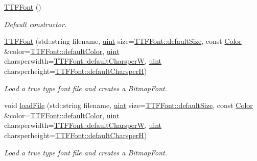 \begin{DoxyCompactItemize}
\item 
\hypertarget{class_f2_c_1_1_t_t_f_font_a20b84ac1e80b09afe11ee08945f8988a}{
\hyperlink{class_f2_c_1_1_t_t_f_font_a20b84ac1e80b09afe11ee08945f8988a}{TTFFont} ()}
\label{class_f2_c_1_1_t_t_f_font_a20b84ac1e80b09afe11ee08945f8988a}

\begin{DoxyCompactList}\small\item\em Default constructor. \item\end{DoxyCompactList}\item 
\hyperlink{class_f2_c_1_1_t_t_f_font_a55de5d906e4a2a79acd2d930f2dd5d80}{TTFFont} (std::string filename, \hyperlink{namespace_f2_c_a58be2bac9eb3e3c99cb41b6008bf4fae}{uint} size=\hyperlink{class_f2_c_1_1_t_t_f_font_a5431854a6264e3b1fcb7f99cde02f1a8}{TTFFont::defaultSize}, const \hyperlink{class_f2_c_1_1_color}{Color} \&color=\hyperlink{class_f2_c_1_1_t_t_f_font_ab7f6ea26f4fb213a32ab1a2df7b201e8}{TTFFont::defaultColor}, \hyperlink{namespace_f2_c_a58be2bac9eb3e3c99cb41b6008bf4fae}{uint} charsperwidth=\hyperlink{class_f2_c_1_1_t_t_f_font_afd75a577433ed3f08eafabe9c49718a0}{TTFFont::defaultCharsperW}, \hyperlink{namespace_f2_c_a58be2bac9eb3e3c99cb41b6008bf4fae}{uint} charsperheight=\hyperlink{class_f2_c_1_1_t_t_f_font_a14b235548ed14123b78d4436956d9639}{TTFFont::defaultCharsperH})
\begin{DoxyCompactList}\small\item\em Load a true type font file and creates a BitmapFont. \item\end{DoxyCompactList}\item 
void \hyperlink{class_f2_c_1_1_t_t_f_font_a3f2ea2a2f2d446a0cf9ac58e9e70ae49}{loadFile} (std::string filename, \hyperlink{namespace_f2_c_a58be2bac9eb3e3c99cb41b6008bf4fae}{uint} size=\hyperlink{class_f2_c_1_1_t_t_f_font_a5431854a6264e3b1fcb7f99cde02f1a8}{TTFFont::defaultSize}, const \hyperlink{class_f2_c_1_1_color}{Color} \&color=\hyperlink{class_f2_c_1_1_t_t_f_font_ab7f6ea26f4fb213a32ab1a2df7b201e8}{TTFFont::defaultColor}, \hyperlink{namespace_f2_c_a58be2bac9eb3e3c99cb41b6008bf4fae}{uint} charsperwidth=\hyperlink{class_f2_c_1_1_t_t_f_font_afd75a577433ed3f08eafabe9c49718a0}{TTFFont::defaultCharsperW}, \hyperlink{namespace_f2_c_a58be2bac9eb3e3c99cb41b6008bf4fae}{uint} charsperheight=\hyperlink{class_f2_c_1_1_t_t_f_font_a14b235548ed14123b78d4436956d9639}{TTFFont::defaultCharsperH})
\begin{DoxyCompactList}\small\item\em Load a true type font file and creates a BitmapFont. \item\end{DoxyCompactList}\item 

\end{DoxyCompactItemize}

